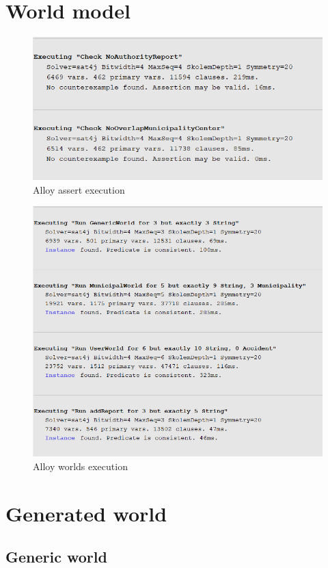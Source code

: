 		\section{World model}
			
			\begin{figure}[!h]
						\includegraphics[width=\textwidth]{images/Alloy/Assert.png}
						\caption{Alloy assert execution}
					\end{figure}
					\begin{figure}[!h]
						\includegraphics[width=\textwidth]{images/Alloy/Worlds.png}
						\caption{Alloy worlds execution}
					\end{figure}
		\section{Generated world}
			\subsection{Generic world}
